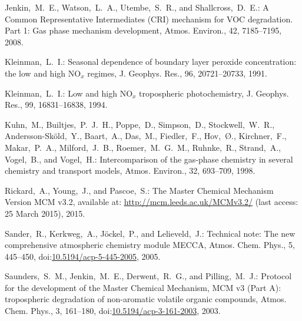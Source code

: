 \documentclass[acpd, online, hvmath]{copernicus}
\begin{document}
\begin{thebibliography}{34}
 Jenkin,~M.~E., Watson,~L.~A.,
  Utembe,~S.~R., and Shallcross,~D.~E.: {A Common Representative
    Intermediates (CRI) mechanism for VOC degradation. Part 1: Gas
    phase mechanism development}, Atmos. Environ., 42, 7185--7195,
  2008.


 Kleinman,~L.~I.: {Seasonal
    dependence of boundary layer peroxide concentration: the low and
    high NO$_{x}$ regimes}, J. Geophys. Res., 96, 20721--20733,
  1991.


 Kleinman,~L.~I.: {Low and
    high NO$_{x}$ tropospheric photochemistry}, J. Geophys. Res.,
  99, 16831--16838, 1994.


  Kuhn,~M., Builtjes,~P.~J.~H., Poppe,~D., Simpson,~D.,
  Stockwell,~W.~R., Andersson-Sk{\"o}ld,~Y., Baart,~A., Das,~M.,
  Fiedler,~F., Hov,~{\O}., Kirchner,~F., Makar,~P.~A., Milford,~J.~B.,
  Roemer,~M.~G.~M., Ruhnke,~R., Strand,~A., Vogel,~B., and Vogel,~H.:
  {Intercomparison of the gas-phase chemistry in several chemistry and
    transport models}, Atmos. Environ., 32, 693--709, 1998.


  Rickard,~A., Young,~J., and Pascoe,~S.: {The Master Chemical
    Mechanism Version MCM v3.2}, available at:
  \url{http://mcm.leeds.ac.uk/MCMv3.2/} (last access: 25 March 2015),
  2015.


 Sander,~R., Kerkweg,~A., J\"{o}ckel,~P.,
  and Lelieveld,~J.: Technical note: The new comprehensive atmospheric
  chemistry module MECCA, Atmos. Chem. Phys., 5, 445--450,
  doi:\href{http://dx.doi.org/10.5194/acp-5-445-2005}{10.5194/acp-5-445-2005}, 2005.



 Saunders,~S.~M., Jenkin,~M.~E.,
  Derwent,~R.~G., and Pilling,~M.~J.: Protocol for the development of
  the Master Chemical Mechanism, MCM v3 (Part A): tropospheric
  degradation of non-aromatic volatile organic compounds,
  Atmos. Chem. Phys., 3, 161--180,
doi:\href{http://dx.doi.org/10.5194/acp-3-161-2003}{10.5194/acp-3-161-2003},
  2003.




\end{thebibliography}
\end{document}
